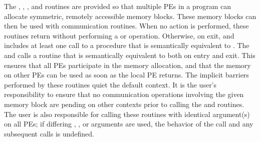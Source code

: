 \begin{apidefinition}
{    The , , , and  routines
    are provided  so that multiple \acp{PE} in a program can allocate symmetric,
    remotely accessible memory blocks.  These memory blocks can then be used with
    \openshmem communication routines.  When no action is performed, these
    routines return without performing a  or
	 operation.
	Otherwise, on exit,  and  includes at least
	one call to a procedure that is semantically equivalent to
	. The  and 
	calls a routine that is semantically equivalent to
	 both on entry and exit.
    This ensures that all
    \acp{PE} participate in the memory allocation, and that the memory on other
    \acp{PE} can be used as soon as the local \ac{PE} returns.
    The implicit barriers performed by these routines quiet the
    default context.  It is the user's responsibility to ensure that no
    communication operations involving the given memory block are pending on
    other contexts prior to calling
    the  and  routines.
    The user is also
    responsible for calling these routines with identical argument(s) on all
    \acp{PE}; if differing , , or  arguments are used, the behavior of the call
    and any subsequent \openshmem calls is undefined.
}


\end{apidefinition}

